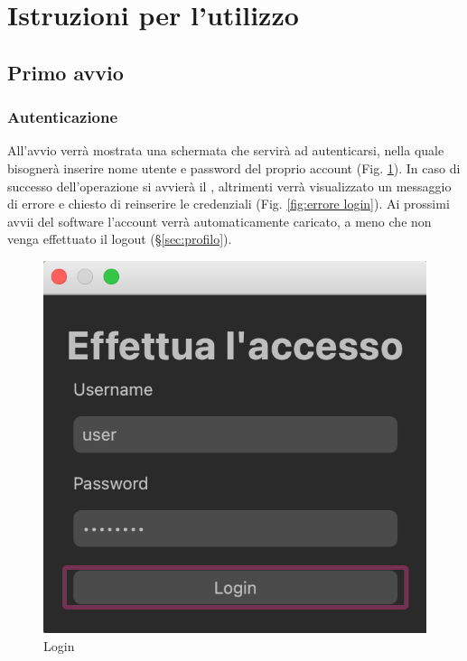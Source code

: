 \section{Istruzioni per l'utilizzo}

\subsection{Primo avvio}
\subsubsection{Autenticazione}
\label{sec:autenticazione}
All'avvio verrà mostrata una schermata che servirà ad autenticarsi, nella quale bisognerà inserire nome utente e password del proprio account  (Fig. \ref{fig:Vista del login}). In caso di successo dell'operazione si avvierà il , altrimenti verrà visualizzato un messaggio di errore e chiesto di reinserire le credenziali (Fig. \ref{fig:errore login}).  \newline
Ai prossimi avvii del software l'account verrà automaticamente caricato, a meno che non venga effettuato il logout (\S{}\ref{sec:profilo}).
\begin{figure}[H]
    \centering
    \includegraphics[scale = 0.50]{components/img/login.png}
    \caption{Login}
    \label{fig:Vista del login}
\end{figure}
